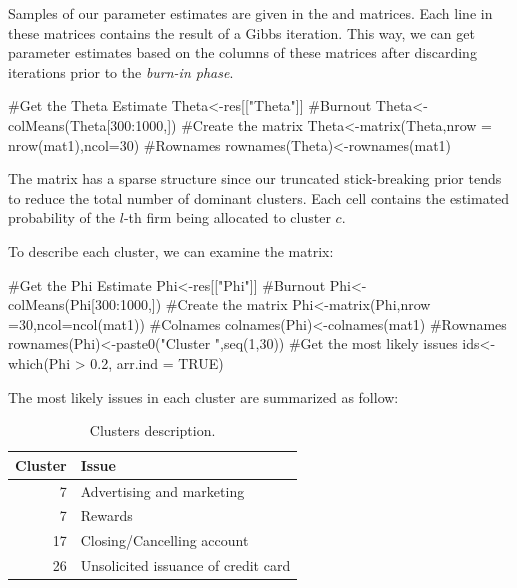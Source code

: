 \documentclass[article]{jss}
\begin{document}
Samples of our parameter estimates are given in the  and
 matrices. Each line in these matrices contains the result of
a Gibbs iteration. This way, we can get parameter estimates based on the
columns of these matrices after discarding iterations prior to the
\emph{burn-in phase}.

\begin{CodeChunk}
\begin{CodeInput}
#Get the Theta Estimate
Theta<-res[["Theta"]]
#Burnout
Theta<-colMeans(Theta[300:1000,])
#Create the matrix
Theta<-matrix(Theta,nrow = nrow(mat1),ncol=30)
#Rownames
rownames(Theta)<-rownames(mat1)
\end{CodeInput}
\end{CodeChunk}

The  matrix has a sparse structure since our truncated
stick-breaking prior tends to reduce the total number of dominant
clusters. Each cell contains the estimated probability of the \(l\)-th
firm being allocated to cluster \(c\).

To describe each cluster, we can examine the  matrix:

\begin{CodeChunk}
\begin{CodeInput}
#Get the Phi Estimate
Phi<-res[["Phi"]]
#Burnout
Phi<-colMeans(Phi[300:1000,])
#Create the matrix
Phi<-matrix(Phi,nrow =30,ncol=ncol(mat1))
#Colnames
colnames(Phi)<-colnames(mat1)
#Rownames
rownames(Phi)<-paste0("Cluster ",seq(1,30))
#Get the most likely issues
ids<-which(Phi > 0.2, arr.ind = TRUE)
\end{CodeInput}
\end{CodeChunk}

The most likely issues in each cluster are summarized as follow:

\begin{table}[ht]
\centering
\begingroup\fontsize{9pt}{10pt}\selectfont
\begin{tabular}{rl}
  \hline
Cluster & Issue \\ 
  \hline
7 & Advertising and marketing \\ 
  7 & Rewards \\ 
  17 & Closing/Cancelling account \\ 
  26 & Unsolicited issuance of credit card \\ 
   \hline
\end{tabular}
\endgroup
\caption{Clusters description.} 
\end{table}
\end{document}
